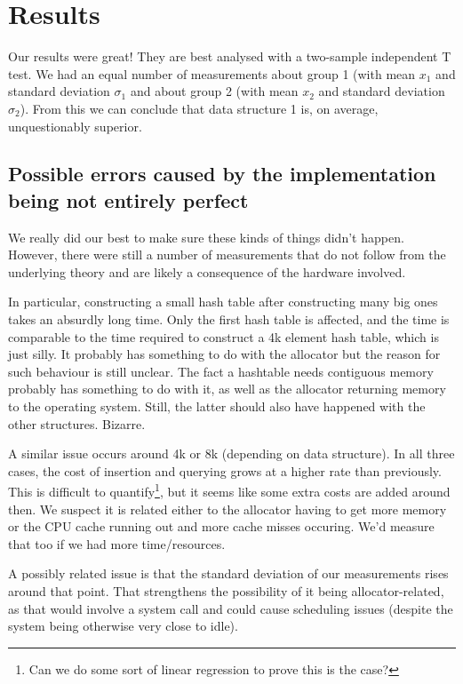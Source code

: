 \documentclass[12pt,a4paper]{article}
\begin{document}
    \section{Results}

    Our results were great!  They are best analysed with a two-sample independent T test.  We had an
    equal number of measurements about group 1 (with mean $x_1$ and standard deviation $\sigma_1$ and
    about group 2 (with mean $x_2$ and standard deviation $\sigma_2$).  From this we can conclude that
    data structure 1 is, on average, unquestionably superior.

    \subsection{Possible errors caused by the implementation being not entirely perfect}

    We really did our best to make sure these kinds of things didn't happen.  However, there were
    still a number of measurements that do not follow from the underlying theory and are likely a
    consequence of the hardware involved.

    In particular, constructing a small hash table after constructing many big ones takes an
    absurdly long time.  Only the first hash table is affected, and the time is comparable to the
    time required to construct a 4k element hash table, which is just silly.  It probably has
    something to do with the allocator but the reason for such behaviour is still unclear.  The fact
    a hashtable needs contiguous memory probably has something to do with it, as well as the
    allocator returning memory to the operating system.  Still, the latter should also have happened
    with the other structures.  Bizarre.

    A similar issue occurs around 4k or 8k (depending on data structure).  In all three cases, the
    cost of insertion and querying grows at a higher rate than previously.  This is difficult to
    quantify\footnote{Can we do some sort of linear regression to prove this is the case?}, but it
    seems like some extra costs are added around then.  We suspect it is related either to the
    allocator having to get more memory or the CPU cache running out and more cache misses occuring.
    We'd measure that too if we had more time/resources.

    A possibly related issue is that the standard deviation of our measurements rises around that
    point.  That strengthens the possibility of it being allocator-related, as that would involve a
    system call and could cause scheduling issues (despite the system being otherwise very close to
    idle).
\end{document}
